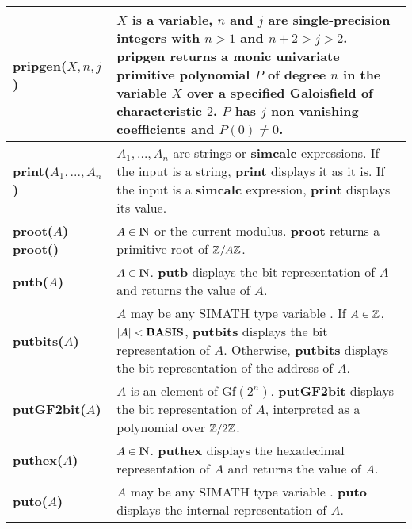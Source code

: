 {\begin{tabular}{|p{1.95in}|p{3.83in}|}
{\bf pripgen($X,n, j$)} &
$X$ is a variable, $n$ and $j$ are single-precision integers
with $n>1$ and $n+2>j>2$.\newline
{\bf pripgen} returns a monic univariate primitive polynomial $P$
of degree $n$ in the variable $X$ over a specified Galoisfield of
characteristic $2$. $P$ has $j$ non vanishing coefficients and
$P(0)\not= 0$. \\ \hline

{\bf print($A_1, ..., A_n$)} &
$A_1,...,A_n$ are strings or {\bf simcalc} expressions.\newline
If the input is a string, {\bf print} displays it as it is. If the input
is a {\bf simcalc} expression, {\bf print} displays its value.\\ \hline

{\bf proot($A$)\newline
proot()} &
$A\in {\rm{I\!N}}$ or the current modulus.\newline
{\bf proot} returns a primitive root of $\mbox{$\mathbb Z$}/A\mbox{$\mathbb Z$}$.\\ \hline

{\bf putb($A$)} &
$A\in {\rm{I\!N}}$. \newline
{\bf putb} displays the bit representation of $A$ and returns the value of
$A$. \\ \hline

{\bf putbits($A$)} &
$A$ may be any SIMATH type variable .\newline
If $A \in \mbox{$\mathbb Z$}$, $|A| < {\rm {\bf BASIS}}$, {\bf putbits} displays the bit 
representation of $A$. Otherwise, {\bf putbits} displays the bit representation
of the address of $A$.\\ \hline

{\bf putGF2bit($A$)} &
$A$ is an element of Gf$(2^n)$.\newline
{\bf putGF2bit} displays the bit representation of $A$, in\-ter\-pre\-ted as a 
polynomial over $\mbox{$\mathbb Z$}/2\mbox{$\mathbb Z$}$.\\ \hline

{\bf puthex($A$)} &
$A\in {\rm{I\!N}}$. \newline
{\bf puthex} displays the hexadecimal representation of $A$ and returns 
the value of $A$. \\ \hline

{\bf puto($A$)} &
$A$ may be any SIMATH type variable .\newline
{\bf puto} displays the internal representation of $A$. \\ \hline
\end{tabular}

}
